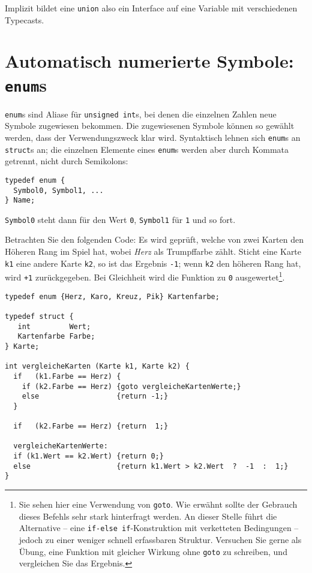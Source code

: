 Implizit bildet eine \texttt{union} also ein Interface auf eine Variable mit verschiedenen Typecasts.

\section{Automatisch numerierte Symbole: \texttt{enum}s}
\texttt{enum}s sind Aliase für \texttt{unsigned int}s, bei denen die einzelnen Zahlen neue Symbole zugewiesen bekommen. Die zugewiesenen Symbole können so gewählt werden, dass der Verwendungszweck klar wird. Syntaktisch lehnen sich \texttt{enum}s an \texttt{struct}s an; die einzelnen Elemente eines \texttt{enum}s werden aber durch Kommata getrennt, nicht durch Semikolons:

\begin{codebox}
\begin{verbatim}
typedef enum {
  Symbol0, Symbol1, ...
} Name;
\end{verbatim}
\end{codebox}
\texttt{Symbol0} steht dann für den Wert \texttt{0}, \texttt{Symbol1} für \texttt{1} und so fort.

Betrachten Sie den folgenden Code: Es wird geprüft, welche von zwei Karten den Höheren Rang im Spiel hat, wobei \emph{Herz} als Trumpffarbe zählt. Sticht eine Karte \texttt{k1} eine andere Karte \texttt{k2}, so ist das Ergebnis \texttt{-1}; wenn \texttt{k2} den höheren Rang hat, wird \texttt{+1} zurückgegeben. Bei Gleichheit wird die Funktion zu \texttt{0} ausgewertet\footnote{Sie sehen hier eine Verwendung von \texttt{goto}. Wie erwähnt sollte der Gebrauch dieses Befehls sehr stark hinterfragt werden. An dieser Stelle führt die Alternative -- eine \texttt{if-else if}-Konstruktion mit verketteten Bedingungen -- jedoch zu einer weniger schnell erfassbaren Struktur. Versuchen Sie gerne als Übung, eine Funktion mit gleicher Wirkung ohne \texttt{goto} zu schreiben, und vergleichen Sie das Ergebnis.}.
\begin{codebox}
\begin{verbatim}
typedef enum {Herz, Karo, Kreuz, Pik} Kartenfarbe;

typedef struct {
   int         Wert;
   Kartenfarbe Farbe;
} Karte;

int vergleicheKarten (Karte k1, Karte k2) {
  if   (k1.Farbe == Herz) {
    if (k2.Farbe == Herz) {goto vergleicheKartenWerte;}
    else                  {return -1;}
  }
  
  if   (k2.Farbe == Herz) {return  1;}
  
  vergleicheKartenWerte:
  if (k1.Wert == k2.Wert) {return 0;}
  else                    {return k1.Wert > k2.Wert  ?  -1  :  1;}
}
\end{verbatim}
\end{codebox}

